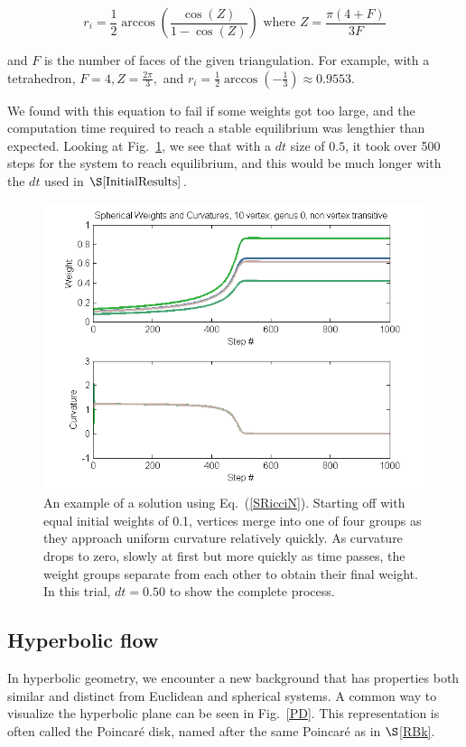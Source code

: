 \documentclass[12pt]{article}
\begin{document}
$$r_i = \frac{1}{2}\arccos(\frac{\cos(Z)}{1 - \cos(Z)}) \mbox{ where } Z = \frac{\pi(4 + F)}{3F}$$

 and $F$ is the number of faces of the given triangulation. For example, with a tetrahedron, $F = 4, Z = \frac{2\pi}{3},$ and $r_i = \frac{1}{2}\arccos(-\frac{1}{3}) \approx 0.9553.$ 

 We found with this equation to fail if some weights got too large, and the computation time required to reach a stable equilibrium was lengthier than expected. Looking at Fig.~\ref{SphGood}, we see that with a $dt$ size of $0.5$, it took over 500 steps for the system to reach equilibrium, and this would be much longer with the $dt$ used in $\S\ref{InitialResults}$.  

\begin{figure}[ht]
\centering
\includegraphics[scale = 0.8]{Pictures/SphG0V10.png}
\caption{An example of a solution using Eq.~(\ref{SRicciN}). Starting off with equal initial weights of 0.1, vertices merge into one of four groups as they approach uniform curvature relatively quickly. As curvature drops to zero, slowly at first but more quickly as time passes, the weight groups separate from each other to obtain their final weight. In this trial, $dt = 0.50$ to show the complete process.}
\label{SphGood}  
\end{figure}

\subsection{Hyperbolic flow}

In hyperbolic geometry, we encounter a new background that has properties both similar and distinct from Euclidean and spherical systems. A common way to visualize the hyperbolic plane can be seen in Fig.~\ref{PD}. This representation is often called the Poincar\'{e} disk, named after the same Poincar\'{e} as in $\S$\ref{RBk}.
\end{document}
